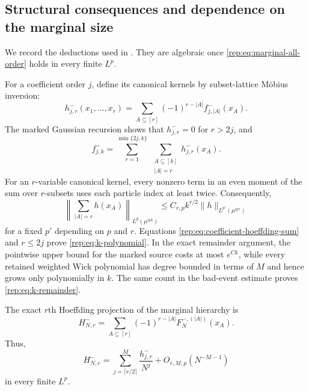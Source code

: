 \documentclass[11pt,reqno]{amsart}
\numberwithin{equation}{section}
\theoremstyle{plain}
\theoremstyle{definition}
\begin{document}
\subsection{Structural consequences and dependence on the marginal size}\label{rep:sec:consequences}

We record the deductions used in . They are algebraic once \eqref{rep:eq:marginal-all-order} holds in every finite $L^p$.

For a coefficient order $j$, define its canonical kernels by subset-lattice M\"obius inversion:
\begin{equation}\label{rep:eq:hoeffding-coeff}
 h^-_{j,r}(x_1,\ldots,x_r)
 =\sum_{A\subseteq[r]}(-1)^{r-|A|}f^-_{j,|A|}(x_A).
\end{equation}
The marked Gaussian recursion shows that $h^-_{j,r}=0$ for $r>2j$, and
\begin{equation}\label{rep:eq:coefficient-hoeffding-sum}
 f^-_{j,k}
 =\sum_{r=1}^{\min\{2j,k\}}\ \sum_{\substack{A\subseteq[k]\\|A|=r}}h^-_{j,r}(x_A).
\end{equation}
For an $r$-variable canonical kernel, every nonzero term in an even moment of the sum over $r$-subsets uses each particle index at least twice. Consequently,
\begin{equation}\label{rep:eq:canonical-subset-sum}
 \left\|\sum_{|A|=r}h(x_A)\right\|_{L^p(\mu^{\otimes k})}
 \le C_{r,p}k^{r/2}\|h\|_{L^{p'}(\mu^{\otimes r})}
\end{equation}
for a fixed $p'$ depending on $p$ and $r$. Equations \eqref{rep:eq:coefficient-hoeffding-sum} and $r\le2j$ prove \eqref{rep:eq:k-polynomial}.  In the exact remainder argument, the pointwise upper bound for the marked source costs at most $e^{Ck}$, while every retained weighted Wick polynomial has degree bounded in terms of $M$ and hence grows only polynomially in $k$.  The same count in the bad-event estimate proves \eqref{rep:eq:k-remainder}.

The exact $r$th Hoeffding projection of the marginal hierarchy is
\begin{equation}\label{rep:eq:exact-hoeffding}
 H^-_{N,r}=\sum_{A\subseteq[r]}(-1)^{r-|A|}F_{N}^{-,(|A|)}(x_A).
\end{equation}
Thus,
\begin{equation}\label{rep:eq:hoeffding-all-order}
 H^-_{N,r}
 =\sum_{j=\lceil r/2\rceil}^{M}\frac{h^-_{j,r}}{N^j}
 +O_{r,M,p}(N^{-M-1})
\end{equation}
in every finite $L^p$.
\end{document}
